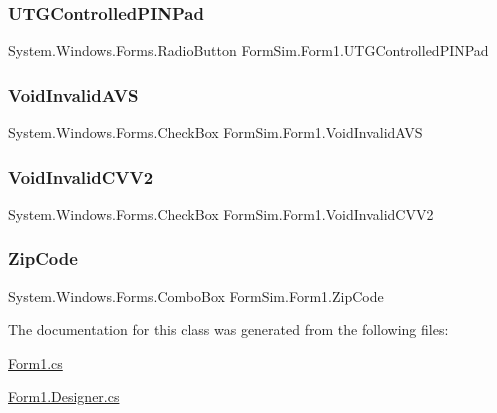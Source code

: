 \subsubsection{\texorpdfstring{U\+T\+G\+Controlled\+P\+I\+N\+Pad}{UTGControlledPINPad}}
{\footnotesize\ttfamily System.\+Windows.\+Forms.\+Radio\+Button Form\+Sim.\+Form1.\+U\+T\+G\+Controlled\+P\+I\+N\+Pad\hspace{0.3cm}{\ttfamily [private]}}

\mbox{\label{class_form_sim_1_1_form1_aa0f74345c5136c35a702e5670cac3f3b}} 
\subsubsection{\texorpdfstring{Void\+Invalid\+A\+VS}{VoidInvalidAVS}}
{\footnotesize\ttfamily System.\+Windows.\+Forms.\+Check\+Box Form\+Sim.\+Form1.\+Void\+Invalid\+A\+VS\hspace{0.3cm}{\ttfamily [private]}}

\mbox{\label{class_form_sim_1_1_form1_ae1cc93ed604fda928b9751fecf1d4873}} 
\subsubsection{\texorpdfstring{Void\+Invalid\+C\+V\+V2}{VoidInvalidCVV2}}
{\footnotesize\ttfamily System.\+Windows.\+Forms.\+Check\+Box Form\+Sim.\+Form1.\+Void\+Invalid\+C\+V\+V2\hspace{0.3cm}{\ttfamily [private]}}

\mbox{\label{class_form_sim_1_1_form1_af9522dc15f4938ce8468fa05ca8b1bd0}} 
\subsubsection{\texorpdfstring{Zip\+Code}{ZipCode}}
{\footnotesize\ttfamily System.\+Windows.\+Forms.\+Combo\+Box Form\+Sim.\+Form1.\+Zip\+Code\hspace{0.3cm}{\ttfamily [private]}}



The documentation for this class was generated from the following files\+:\begin{DoxyCompactItemize}
\item 
\mbox{\hyperlink{_form1_8cs}{Form1.\+cs}}\item 
\mbox{\hyperlink{_form1_8_designer_8cs}{Form1.\+Designer.\+cs}}\end{DoxyCompactItemize}
